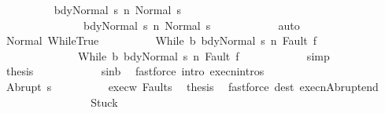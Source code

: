 \begin{isabellebody}
\ \ \ \ \ \ \ \ \isamarkupfalse%
\ {\isachardoublequoteopen}{\isasymGamma}{\isasymturnstile}{\isasymlangle}bdy{}{\isacharcomma}Normal\ s{\isasymrangle}\ {\isacharequal}n{\isasymRightarrow}\ Normal\ s{\isacharprime}{\isacharprime}{\isacharprime}{\isachardoublequoteclose}\ \isanewline
\ \ \ \ \ \ \ \ \ \ \ \ \ \ \ {\isachardoublequoteopen}{\isasymGamma}{\isasymturnstile}{\isasymlangle}bdy{}{\isacharcomma}Normal\ s{\isasymrangle}\ {\isacharequal}n{\isasymRightarrow}\ Normal\ s{\isacharprime}{\isacharprime}{\isacharprime}{\isachardoublequoteclose}\isanewline
\ \ \ \ \ \ \ \ \ \ \isamarkupfalse%
\ auto\isanewline
\ \ \ \ \ \ \ \ \isamarkupfalse%
\isanewline
\ \ \ \ \ \ \ \ \isamarkupfalse%
\ Normal\ WhileTrue\isanewline
\ \ \ \ \ \ \ \ \isamarkupfalse%
\ {\isachardoublequoteopen}{\isasymGamma}{\isasymturnstile}{\isasymlangle}While\ b\ bdy{}{\isacharcomma}Normal\ s{\isacharprime}{\isacharprime}{\isacharprime}{\isasymrangle}\ {\isacharequal}n{\isasymRightarrow}\ Fault\ f\ {\isasymor}\isanewline
\ \ \ \ \ \ \ \ \ \ \ \ \ \ {\isasymGamma}{\isasymturnstile}{\isasymlangle}While\ b\ bdy{}{\isacharcomma}Normal\ s{\isacharprime}{\isacharprime}{\isacharprime}{\isasymrangle}\ {\isacharequal}n{\isasymRightarrow}\ Fault\ f{\isachardoublequoteclose}\isanewline
\ \ \ \ \ \ \ \ \ \ \isamarkupfalse%
\ simp\isanewline
\ \ \ \ \ \ \ \ \isamarkupfalse%
\ \isamarkupfalse%
\ {\isacharquery}thesis\isanewline
\ \ \ \ \ \ \ \ \ \ \isamarkupfalse%
\ s{\isacharunderscore}in{\isacharunderscore}b\ \isamarkupfalse%
\ {\isacharparenleft}fastforce\ intro{\isacharcolon}\ execn{\isachardot}intros{\isacharparenright}\isanewline
\ \ \ \ \ \ \isamarkupfalse%
\isanewline
\ \ \ \ \ \ \ \ \isamarkupfalse%
\ {\isacharparenleft}Abrupt\ s{\isacharprime}{\isacharprime}{\isacharprime}{\isacharparenright}\isanewline
\ \ \ \ \ \ \ \ \isamarkupfalse%
\ exec{\isacharunderscore}w\ Fault{\isacharunderscore}s{\isacharprime}{\isacharprime}\ \isamarkupfalse%
\ {\isacharquery}thesis\ \isamarkupfalse%
\ {\isacharparenleft}fastforce\ dest{\isacharcolon}\ execn{\isacharunderscore}Abrupt{\isacharunderscore}end{\isacharparenright}\isanewline
\ \ \ \ \ \ \isamarkupfalse%
\isanewline
\ \ \ \ \ \ \ \ \isamarkupfalse%
\ Stuck\isanewline
\ \ \ \ \ \ \ \ \isamarkupfalse%

\end{isabellebody}
